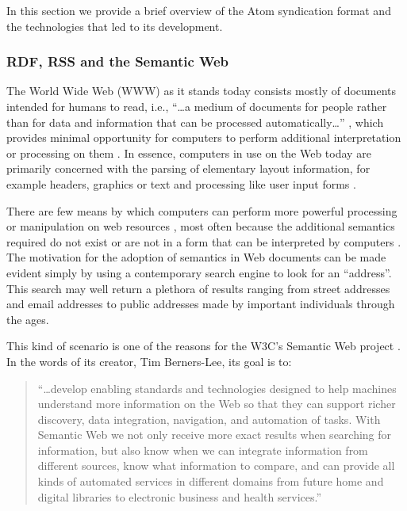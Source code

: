 \documentclass{CRPITStyle}
\begin{document}
In this section we provide a brief overview of the Atom syndication
format and the technologies that led to its development.

\subsubsection{RDF, RSS and the Semantic Web}

The World Wide Web (WWW) as it stands today consists mostly of documents
intended for humans to read, i.e., ``\ldots{}a medium of documents for
people rather than for data and information that can be processed
automatically\ldots'' \cite{Bern-T-2001-SciAm}, which provides minimal
opportunity for computers to perform additional interpretation or
processing on them \cite{Bern-T-1999-WWW,Bern-T-2001-SciAm}. In essence,
computers in use on the Web today are primarily concerned with the
parsing of elementary layout information, for example headers, graphics
or text and processing like user input forms
\cite{Bern-T-1999-W3C,Bern-T-2001-SciAm}.

There are few means by which computers can perform more powerful
processing or manipulation on web resources
\cite{Bern-T-2001-SciAm,Fens-D-2003}, most often because the additional
semantics required do not exist or are not in a form that can be
interpreted by computers \cite{Koiv-MR-2001-W3C}. The motivation for the
adoption of semantics in Web documents can be made evident simply by
using a contemporary search engine to look for an ``address''. This
search may well return a plethora of results ranging from street
addresses and email addresses to public addresses made by important
individuals through the ages.

This kind of scenario is one of the reasons for the W3C's Semantic Web
project \cite{Koiv-MR-2001-W3C}. In the words of its creator, Tim
Berners-Lee, its goal is to:

\begin{quotation}
	``\ldots{}develop enabling standards and technologies designed to help
	machines understand more information on the Web so that they can
	support richer discovery, data integration, navigation, and
	automation of tasks. With Semantic Web we not only receive more
	exact results when searching for information, but also know when we
	can integrate information from different sources, know what
	information to compare, and can provide all kinds of automated
	services in different domains from future home and digital libraries
	to electronic business and health services.'' \cite{Koiv-MR-2001-W3C}
\end{quotation}
\end{document}
